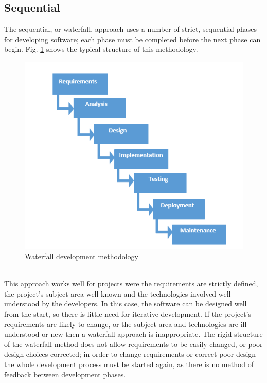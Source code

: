 \subsection{Sequential}
The sequential, or waterfall, approach uses a number of strict, sequential phases for developing software; each phase must be completed before the next phase can begin. Fig. \ref{fig:waterfall} shows the typical structure of this methodology.
\begin{figure}[tp]
   \begin{center}
     \includegraphics{Figures/waterfall.png}
   \end{center}
   \caption[Waterfall development methodology]{Waterfall development methodology \parencite{Naveen}}
   \label{fig:waterfall}
\end{figure}
\\This approach works well for projects were the requirements are strictly defined, the project's subject area well known and the technologies involved well understood by the developers. In this case, the software can be designed well from the start, so there is little need for iterative development. If the project's requirements are likely to change, or the subject area and technologies are ill-understood or new then a waterfall approach is inappropriate. The rigid structure of the waterfall method does not allow requirements to be easily changed, or poor design choices corrected; in order to change requirements or correct poor design the whole development process must be started again, as there is no method of feedback between development phases.

